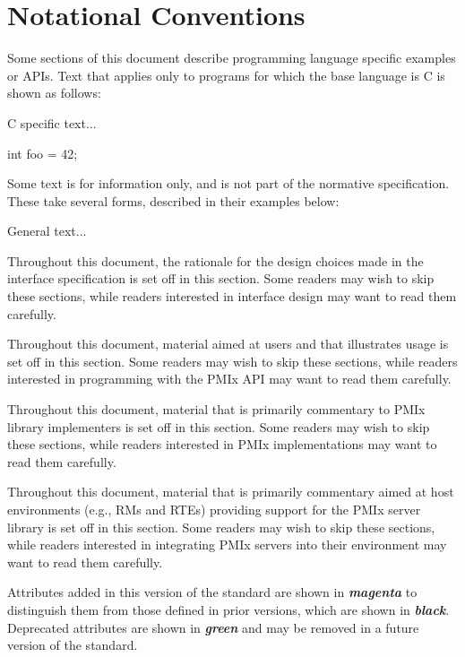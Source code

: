 \section{Notational Conventions}

Some sections of this document describe programming language specific examples or \acp{API}.
Text that applies only to programs for which the base language is C is shown as follows:

\cspecificstart
C specific text...
\begin{codepar}
int foo = 42;
\end{codepar}
\cspecificend

Some text is for information only, and is not part of the normative specification.
These take several forms, described in their examples below:

\notestart
\noteheader
General text...
\noteend

\rationalestart
Throughout this document, the rationale for the design choices made in the interface specification is set off in this section.
Some readers may wish to skip these sections, while readers interested in interface design may want to read them carefully.
\rationaleend

\adviceuserstart
Throughout this document, material aimed at users and that illustrates usage is set off in this section.
Some readers may wish to skip these sections, while readers interested in programming with the \ac{PMIx} \ac{API} may want to read them carefully.
\adviceuserend

\adviceimplstart
Throughout this document, material that is primarily commentary to \ac{PMIx} library implementers is set off in this section.
Some readers may wish to skip these sections, while readers interested in \ac{PMIx} implementations may want to read them carefully.
\adviceimplend

\advicermstart
Throughout this document, material that is primarily commentary aimed at host environments (e.g., \acp{RM} and \acp{RTE}) providing support for the \ac{PMIx} server library is set off in this section.
Some readers may wish to skip these sections, while readers interested in integrating \ac{PMIx} servers into their environment may want to read them carefully.
\advicermend

Attributes added in this version of the standard are shown in \textit{\textbf{\color{magenta}magenta}} to distinguish them from those defined in prior versions, which are shown in \textit{\textbf{black}}. Deprecated attributes are shown in \textit{\textbf{\color{green!80!black}green}} and may be removed in a future version of the standard.

